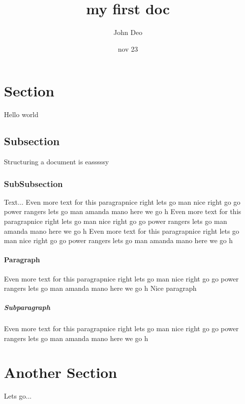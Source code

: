 \documentclass{article}
\title{my first doc}
\date{nov 23}
\author{John Deo}
\begin{document}
  \maketitle
  \newpage

  \section{Section}
  Hello world
  
  \subsection{Subsection}
  Structuring a document is easssssy

  \subsubsection{SubSubsection}
  Text...
  Even more text for this paragrapnice right lets go man nice right go go power rangers lets go man amanda mano here we go h
  Even more text for this paragrapnice right lets go man nice right go go power rangers lets go man amanda mano here we go h
  Even more text for this paragrapnice right lets go man nice right go go power rangers lets go man amanda mano here we go h

  \paragraph{Paragraph}
  Even more text for this paragrapnice right lets go man nice right go go power rangers lets go man amanda mano here we go h
  Nice paragraph
  \subparagraph{Subparagraph}
  Even more text for this paragrapnice right lets go man nice right go go power rangers lets go man amanda mano here we go h


  \section{Another Section}
  Lets go... 
\end{document}
